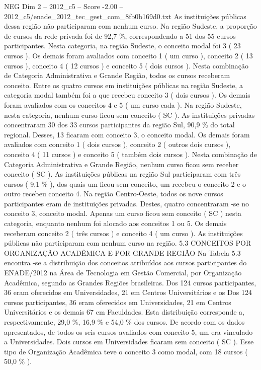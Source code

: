 \begin{textsample}{NEG Dim 2 – 2012\_c5 – Score -2.00 – 2012\_c5/enade\_2012\_tec\_gest\_com\_8fb0b169d0.txt}
As instituições públicas dessa região não participaram com nenhum curso.
Na região Sudeste, a proporção de cursos da rede privada foi de 92,7 \%, correspondendo a 51 dos 55 cursos participantes.
Nesta categoria, na região Sudeste, o conceito modal foi 3 ( 23 cursos ).
Os demais foram avaliados com conceito 1 ( um curso ), conceito 2 ( 13 cursos ), conceito 4 ( 12 cursos ) e conceito 5 ( dois cursos ).
Nesta combinação de Categoria Administrativa e Grande Região, todos os cursos receberam conceito.
Entre os quatro cursos em instituições públicas na região Sudeste, a categoria modal também foi a que recebeu conceito 3 ( dois cursos ).
Os demais foram avaliados com os conceitos 4 e 5 ( um curso cada ).
Na região Sudeste, nesta categoria, nenhum curso ficou sem conceito ( SC ).
As instituições privadas concentraram 30 dos 33 cursos participantes da região Sul, 90,9 \% do total regional.
Desses, 13 ficaram com conceito 3, o conceito modal.
Os demais foram avaliados com conceito 1 ( dois cursos ), conceito 2 ( outros dois cursos ), conceito 4 ( 11 cursos ) e conceito 5 ( também dois cursos ).
Nesta combinação de Categoria Administrativa e Grande Região, nenhum curso ficou sem receber conceito ( SC ).
As instituições públicas na região Sul participaram com três cursos ( 9,1 \% ), dos quais um ficou sem conceito, um recebeu o conceito 2 e o outro recebeu conceito 4.
Na região Centro-Oeste, todos os nove cursos participantes eram de instituições privadas.
Destes, quatro concentraram -se no conceito 3, conceito modal.
Apenas um curso ficou sem conceito ( SC ) nesta categoria, enquanto nenhum foi alocado aos conceitos 1 ou 5.
Os demais receberam conceito 2 ( três cursos ) e conceito 4 ( um curso ).
As instituições públicas não participaram com nenhum curso na região. 5.3 CONCEITOS POR ORGANIZAÇÃO ACADÊMICA E POR GRANDE REGIÃO Na Tabela 5.3 encontra -se a distribuição dos conceitos atribuídos aos cursos participantes do ENADE/2012 na Área de Tecnologia em Gestão Comercial, por Organização Acadêmica, segundo as Grandes Regiões brasileiras.
Dos 124 cursos participantes, 36 eram oferecidos em Universidades, 21 em Centros Universitários e os Dos 124 cursos participantes, 36 eram oferecidos em Universidades, 21 em Centros Universitários e os demais 67 em Faculdades.
Esta distribuição corresponde a, respectivamente, 29,0 \%, 16,9 \% e 54,0 \% dos cursos.
De acordo com os dados apresentados, de todos os seis cursos avaliados com conceito 5, um era vinculado a Universidades.
Dois cursos em Universidades ficaram sem conceito ( SC ).
Esse tipo de Organização Acadêmica teve o conceito 3 como modal, com 18 cursos ( 50,0 \% ).

\end{textsample}
